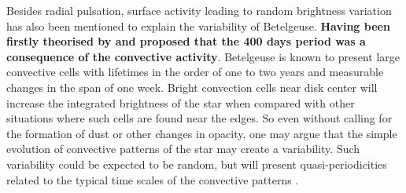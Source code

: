 \documentclass{aa}
\begin{document}
Besides radial pulsation, surface activity leading to random brightness variation has also been mentioned to explain the variability of Betelgeuse. \textbf{Having been firstly theorised by \cite{schwarzschild_scale_1975} and \cite{gray_mass_2008} 
proposed that the 400 days period was a consequence of the convective activity}. Betelgeuse is known to present large convective cells with lifetimes in the order of one to two years \citep{lopez_ariste_convective_2018} and measurable changes 
in the span of one week. Bright convection cells near disk center will increase the integrated brightness of the star when 
compared with other situations where such cells are found near the edges. So even without calling for the formation of 
dust or other changes in opacity, one may argue that the simple evolution of convective patterns of the star may create a variability. Such 
variability could be expected to be random, but will present quasi-periodicities related to the typical time scales of the 
convective patterns \citep{gray_mass_2008}. \\

\end{document}
